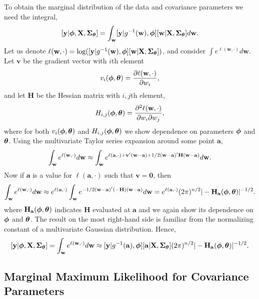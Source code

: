 \documentclass[12pt, titlepage]{article}
\begin{document}
To obtain the marginal distribution of the data and covariance parameters we need the integral,
$$
	[\mathbf{y}| \boldsymbol{\phi}, \mathbf{X},\mbox{\boldmath $\Sigma$}_{\boldsymbol{\theta}}] = \int_\mathbf{w}  [\mathbf{y}|g^{-1}(\mathbf{w}),\boldsymbol{\phi}][\mathbf{w}|\mathbf{X},\mbox{\boldmath $\Sigma$}_{\boldsymbol{\theta}}]d\mathbf{w}.
$$
Let us denote $\ell(\mathbf{w},\cdot) = \textrm{log}([\mathbf{y}|g^{-1}(\mathbf{w}),\boldsymbol{\phi}][\mathbf{w}|\mathbf{X},\mbox{\boldmath $\Sigma$}_{\boldsymbol{\theta}}])$, and consider $\int e^{\ell(\mathbf{w},\cdot)} d\mathbf{w}$. Let $\mathbf{v}$ be the gradient vector with $i$th element
$$
v_{i}(\boldsymbol{\phi},\boldsymbol{\theta}) = \frac{\partial \ell(\mathbf{w},\cdot)}{\partial w_i},
$$
and let $\mathbf{H}$ be the Hessian matrix with $i,j$th element,
$$
H_{i,j}(\boldsymbol{\phi},\boldsymbol{\theta}) = \frac{\partial^2 \ell(\mathbf{w},\cdot)}{\partial w_i\partial w_j},
$$
where for both $v_{i}(\boldsymbol{\phi},\boldsymbol{\theta})$ and $H_{i,j}(\boldsymbol{\phi},\boldsymbol{\theta})$ we show dependence on parameters $\boldsymbol{\phi}$ and $\boldsymbol{\theta}$. Using the multivariate Taylor series expansion around some point $\mathbf{a}$,
$$
\int_\mathbf{w} e^{\ell(\mathbf{w},\cdot)} d\mathbf{w} \approx \int_\mathbf{w} e^{\ell(\mathbf{a},\cdot) + \mathbf{v}^{\prime}(\mathbf{w} -\mathbf{a}) + 1/2(\mathbf{w} - \mathbf{a})^{\prime}\mathbf{H}(\mathbf{w} - \mathbf{a})} d\mathbf{w}.
$$
Now if $\mathbf{a}$ is a value for $\ell(\mathbf{a},\cdot)$ such that $\mathbf{v} = \mathbf{0}$, then
$$
\int_\mathbf{w} e^{\ell(\mathbf{w},\cdot)} d\mathbf{w} \approx e^{\ell(\mathbf{a},\cdot)} \int_{\mathbf{w}} e^{ -  
	1/2(\mathbf{w} - \mathbf{a})^{\prime}(-\mathbf{H})(\mathbf{w} - \mathbf{a})} d\mathbf{w} = e^{\ell(\mathbf{a},\cdot)} (2\pi)^{n/2}|-\mathbf{H}_\mathbf{a}(\boldsymbol{\phi},\boldsymbol{\theta})|^{-1/2}.
$$
where $\mathbf{H}_\mathbf{a}(\boldsymbol{\phi},\boldsymbol{\theta})$ indicates $\mathbf{H}$ evaluated at $\mathbf{a}$ and we again show its dependence on $\boldsymbol{\phi}$ and $\boldsymbol{\theta}$. The result on the most right-hand side is familiar from the normalizing constant of a multivariate Gaussian distribution.  Hence,
\begin{equation} \label{eq:covparmmarg}
[\mathbf{y}|\boldsymbol{\phi},\mathbf{X},\mbox{\boldmath $\Sigma$}_{\boldsymbol{\theta}}] = \int_\mathbf{w} e^{\ell(\mathbf{w},\cdot)} d\mathbf{w} \approx  [\mathbf{y}|g^{-1}(\mathbf{a}),\boldsymbol{\phi}][\mathbf{a}|\mathbf{X},\mbox{\boldmath $\Sigma$}_{\boldsymbol{\theta}}](2\pi)^{n/2}|-\mathbf{H}_\mathbf{a}(\boldsymbol{\phi},\boldsymbol{\theta})|^{-1/2}.
\end{equation}
{}

\subsection{Marginal Maximum Likelihood for Covariance Parameters}
\end{document}
